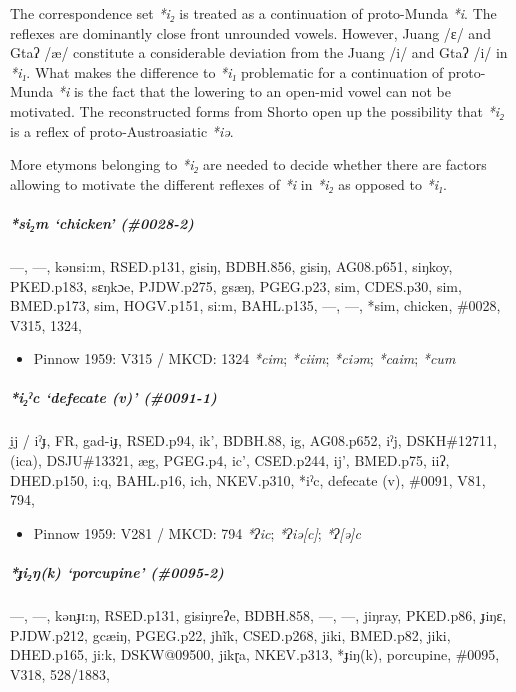 \documentclass[a4paper,]{article}
\providecommand{\tightlist}{%
  \setlength{\itemsep}{0pt}\setlength{\parskip}{0pt}}
\let\oldsubparagraph\subparagraph
\renewcommand{\subparagraph}[1]{\oldsubparagraph{#1}\mbox{}}
\begin{document}
The correspondence set \emph{*i₂} is treated as a continuation of
proto-Munda \emph{*i}. The reflexes are dominantly close front unrounded
vowels. However, Juang /ɛ/ and Gtaʔ /æ/ constitute a considerable
deviation from the Juang /i/ and Gtaʔ /i/ in \emph{*i₁}. What makes the
difference to \emph{*i₁} problematic for a continuation of proto-Munda
\emph{*i} is the fact that the lowering to an open-mid vowel can not be
motivated. The reconstructed forms from Shorto open up the possibility
that \emph{*i₂} is a reflex of proto-Austroasiatic \emph{*iə}.

More etymons belonging to \emph{*i₂} are needed to decide whether there
are factors allowing to motivate the different reflexes of \emph{*i} in
\emph{*i₂} as opposed to \emph{*i₁}.

\subparagraph{\texorpdfstring{\emph{*si₂m} `chicken'
(\#0028-2)}{*si₂m chicken (\#0028-2)}}\label{sim-chicken-0028-2}

---, ---, kənsi:m, RSED.p131, gisiŋ, BDBH.856, gisiŋ, AG08.p651, siŋkoy,
PKED.p183, sɛŋkɔe, PJDW.p275, gsæŋ, PGEG.p23, sim, CDES.p30, sim,
BMED.p173, sim, HOGV.p151, si:m, BAHL.p135, ---, ---, *sim, chicken,
\#0028, V315, 1324,

\begin{itemize}
\tightlist
\item
  Pinnow 1959: V315 / MKCD: 1324 \emph{*cim}; \emph{*ciim};
  \emph{*ciəm}; \emph{*caim}; \emph{*cum}
\end{itemize}

\subparagraph{\texorpdfstring{\emph{*i₂ˀc} `defecate (v)'
(\#0091-1)}{*i₂ˀc defecate (v) (\#0091-1)}}\label{iux2c0c-defecate-v-0091-1}

ḭj / iˀɟ, FR, gad-iɟ, RSED.p94, ik', BDBH.88, ig, AG08.p652, iˀj,
DSKH\#12711, (ica), DSJU\#13321, æg, PGEG.p4, ic', CSED.p244, ij',
BMED.p75, iiʔ, DHED.p150, i:q, BAHL.p16, ich, NKEV.p310, *iˀc, defecate
(v), \#0091, V81, 794,

\begin{itemize}
\tightlist
\item
  Pinnow 1959: V281 / MKCD: 794 \emph{*ʔic}; \emph{*ʔiə{[}c{]}};
  \emph{*ʔ{[}ə{]}c}
\end{itemize}

\subparagraph{\texorpdfstring{\emph{*ɟi₂ŋ(k)} `porcupine'
(\#0095-2)}{*ɟi₂ŋ(k) porcupine (\#0095-2)}}\label{ux25fiux14bk-porcupine-0095-2}

---, ---, kənɟɪ:ŋ, RSED.p131, gisiŋreʔe, BDBH.858, ---, ---, jiŋray,
PKED.p86, ɟiŋɛ, PJDW.p212, gcæiŋ, PGEG.p22, jhĩk, CSED.p268, jiki,
BMED.p82, jiki, DHED.p165, ji:k, DSKW@09500, jikɽa, NKEV.p313, *ɟiŋ(k),
porcupine, \#0095, V318, 528/1883,
\end{document}
